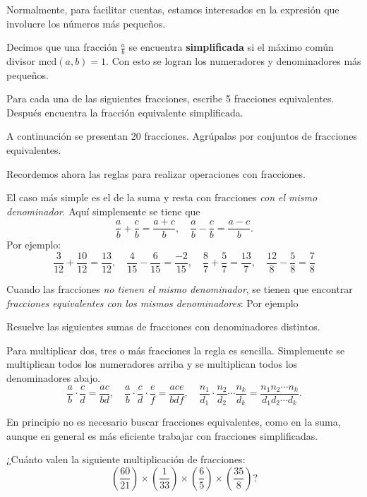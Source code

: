 Normalmente, para facilitar cuentas, estamos interesados en la expresión que involucre los números más pequeños. 

Decimos que una fracción $\frac{a}{b}$ se encuentra {\bf simplificada} si el máximo común divisor $\mathrm{mcd}(a,b)=1$. Con esto se logran los numeradores y denominadores más pequeños. 

\begin{ejercicio}
Para cada una de las siguientes fracciones, escribe 5 fracciones equivalentes. Después encuentra la fracción equivalente simplificada.
\end{ejercicio}

\begin{ejercicio}
A continuación se presentan 20 fracciones. Agrúpalas por conjuntos de fracciones equivalentes.
\end{ejercicio}

Recordemos ahora las reglas para realizar operaciones con fracciones.

El caso más simple es el de la suma y resta con fracciones \emph{con el mismo denominador}. Aquí simplemente se tiene que $$\frac{a}{b}+\frac{c}{b}=\frac{a+c}{b},\quad \frac{a}{b}-\frac{c}{b}=\frac{a-c}{b}.$$
Por ejemplo:
$$\frac{3}{12}+\frac{10}{12}=\frac{13}{12},\quad \frac{4}{15}-\frac{6}{15}=\frac{-2}{15}, \quad \frac{8}{7}+\frac{5}{7}=\frac{13}{7},\quad \frac{12}{8}-\frac{5}{8}=\frac{7}{8}$$

Cuando las fracciones \emph{no tienen el mismo denominador}, se tienen que encontrar \emph{fracciones equivalentes con los mismos denominadores}: Por ejemplo

\begin{ejercicio}
Resuelve las siguientes sumas de fracciones con denominadores distintos.
\end{ejercicio}

Para multiplicar dos, tres o más fracciones la regla es sencilla. Simplemente se multiplican todos los numeradores arriba y se multiplican todos los denominadores abajo. $$\frac{a}{b}\cdot\frac{c}{d}=\frac{ac}{bd},\quad \frac{a}{b}\cdot\frac{c}{d}\cdot\frac{e}{f}=\frac{ace}{bdf}, \quad \frac{n_1}{d_1}\cdot\frac{n_2}{d_2}\cdots \frac{n_k}{d_k}=\frac{n_1n_2\cdots n_k}{d_1d_2\cdots d_k}.$$ 

En principio no es necesario buscar fracciones equivalentes, como en la suma, aunque en general es más eficiente trabajar con fracciones simplificadas.

\begin{ejercicio}
¿Cuánto valen la siguiente multiplicación de fracciones: $$\left(\frac{60}{21}\right)\times\left(\frac{1}{33}\right)\times\left(\frac{6}{5}\right)\times \left(\frac{35}{8}\right)?$$
\end{ejercicio}

